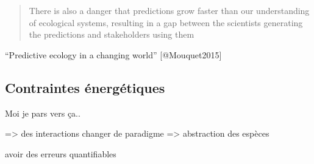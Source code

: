 \begin{quote}
There is also a danger that predictions grow faster than our
understanding of ecological systems, resulting in a gap between the
scientists generating the predictions and stakeholders using them
\end{quote}

``Predictive ecology in a changing world'' {[}@Mouquet2015{]}

\subsection{Contraintes
énergétiques}\label{contraintes-uxe9nerguxe9tiques}

Moi je pars vers ça..

=\textgreater{} des interactions changer de paradigme =\textgreater{}
abstraction des espèces

avoir des erreurs quantifiables
